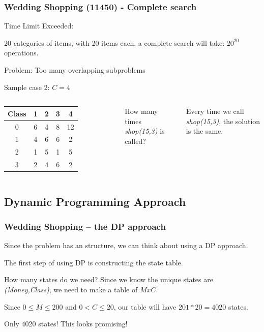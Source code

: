 \documentclass{beamer}
\begin{document}
\begin{frame}
  \frametitle{Wedding Shopping (11450) - Complete search}
  
  \alert{Time Limit Exceeded:}

  \bigskip

  20 categories of items, with 20 items each, a complete search will
  take: $20^{20}$ operations.

  \vfill

  \alert{Problem: Too many overlapping subproblems}
  

  \begin{block}{Sample case 2: $C=4$}

    \medskip

    \begin{columns}[T]
      \begin{tabular}{|c|cccc|}
        Class & 1 & 2 & 3 & 4\\
        \hline
        0 & 6 & 4 & 8 & 12\\
        1 & 4 & 6 & 6 & 2\\
        2 & 1 & 5 & 1 & 5\\
        3 & 2 & 4 & 6 & 2\\
      \end{tabular}
      How many times \emph{shop(15,3)} is called?
      
      \bigskip

      Every time we call \emph{shop(15,3)}, the solution is the same.

    \end{columns}
  \end{block}
\end{frame}

\subsection{Dynamic Programming Approach}

\begin{frame}
  \frametitle{Wedding Shopping -- the DP approach}

  Since the problem has an 
  structure, we can think about using a DP approach.

  \bigskip

  The first step of using DP is constructing the state table.

  \smallskip

  \begin{block}{How many states do we need?}
    Since we know the unique states are \emph{(Money,Class)}, we need
    to make a table of $M x C$.

    \bigskip

    Since $0 \leq M \leq 200$ and $0 < C \leq 20$, our table will have
    \alert{$201*20=4020$ states}.
  \end{block}

  \smallskip

  Only 4020 states! This looks promising!
\end{frame}
\end{document}
